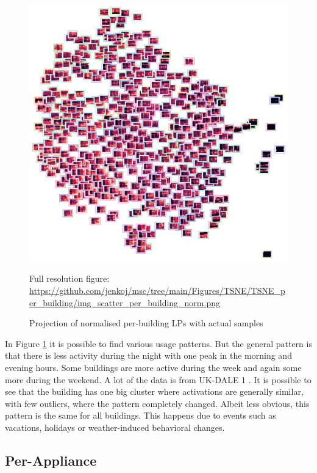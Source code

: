 \begin{figure}[H]
	\centering
	\caption{Projection of normalised per-building LPs with actual samples}
	\includegraphics[width=.9\textwidth]{Figures/TSNE/TSNE_per_building/img_scatter_per_building_norm.png}
	\label{fig:tsne_pb_img_norm_scatter_allall}
	\par
	\par\footnotesize{Full resolution figure: \url{https://github.com/jenkoj/msc/tree/main/Figures/TSNE/TSNE_per_building/img_scatter_per_building_norm.png}}
\end{figure}

In Figure \ref{fig:tsne_pb_img_norm_scatter_allall} it is possible to find various usage patterns. 
But the general pattern is that there is less activity during the night with one peak in the morning and evening hours.
Some buildings are more active during the week and again some more during the weekend.
A lot of the data is from UK-DALE 1 . 
It is possible to see that the building has one big cluster where activations are generally similar, with few outliers, where the pattern completely changed. 
Albeit less obvious, this pattern is the same for all buildings.
This happens due to events such as vacations, holidays or weather-induced behavioral changes.

\subsection{Per-Appliance}

